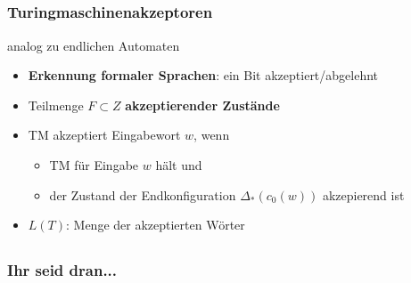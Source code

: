 \subsection*{}
\begin{frame}
  \frametitle{Turingmaschinenakzeptoren}
  \pause
  \begin{block}{analog zu endlichen Automaten}
\begin{itemize}
	\item   \textbf{Erkennung formaler Sprachen}: ein Bit akzeptiert/abgelehnt
	\pause
  \item		Teilmenge $F \subset Z$ \textbf{akzeptierender Zustände}
  \item		TM akzeptiert Eingabewort $w$, wenn
\begin{itemize}
	\pause
	\item TM für Eingabe $w$ hält und
	\pause
	\item der Zustand der Endkonfiguration $\Delta_{*}(c_0(w))$ akzepierend ist
\end{itemize}
\pause
\item $L(T)$: Menge der akzeptierten Wörter
\end{itemize}
\end{block}
\end{frame}

\subsection*{}
\begin{frame}
  \frametitle{Ihr seid dran...}
\end{frame}

